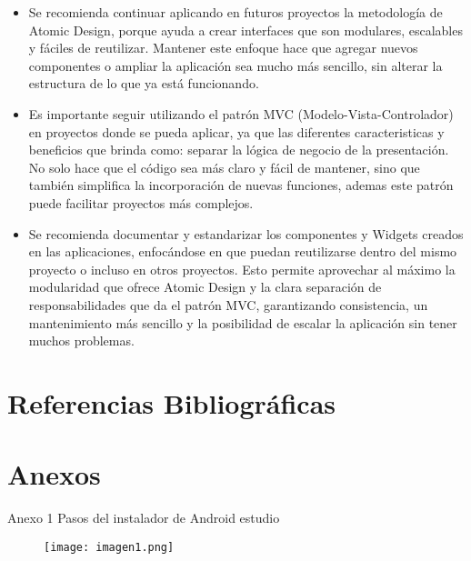 \documentclass[12pt,letterpaper]{article}
\begin{document}
\begin{itemize}
    \item Se recomienda continuar aplicando en futuros proyectos la metodología de Atomic Design, porque ayuda a crear interfaces que son modulares, escalables y fáciles de reutilizar. Mantener este enfoque hace que agregar nuevos componentes o ampliar la aplicación sea mucho más sencillo, sin alterar la estructura de lo que ya está funcionando.
    
    \item Es importante seguir utilizando el patrón MVC (Modelo-Vista-Controlador) en proyectos donde se pueda aplicar, ya que las diferentes caracteristicas y beneficios que brinda como: separar la lógica de negocio de la presentación. No solo hace que el código sea más claro y fácil de mantener, sino que también simplifica la incorporación de nuevas funciones, ademas este patrón puede facilitar proyectos más complejos.
    
    \item Se recomienda documentar y estandarizar los componentes y Widgets creados en las aplicaciones, enfocándose en que puedan reutilizarse dentro del mismo proyecto o incluso en otros proyectos. Esto permite aprovechar al máximo la modularidad que ofrece Atomic Design y la clara separación de responsabilidades que da el patrón MVC, garantizando consistencia, un mantenimiento más sencillo y la posibilidad de escalar la aplicación sin tener muchos problemas.
\end{itemize}



\section{Referencias Bibliográficas}
\printbibliography[heading=none]


\section{Anexos}
Anexo 1 Pasos del instalador de Android estudio
\begin{figure}[h!]
    \centering
    \texttt{[image: imagen1.png]}
\end{figure}
\end{document}
